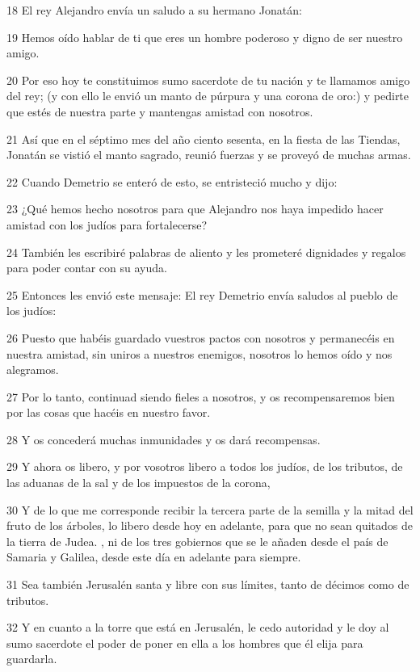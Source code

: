 \par 18 El rey Alejandro envía un saludo a su hermano Jonatán:
\par 19 Hemos oído hablar de ti que eres un hombre poderoso y digno de ser nuestro amigo.
\par 20 Por eso hoy te constituimos sumo sacerdote de tu nación y te llamamos amigo del rey; (y con ello le envió un manto de púrpura y una corona de oro:) y pedirte que estés de nuestra parte y mantengas amistad con nosotros.
\par 21 Así que en el séptimo mes del año ciento sesenta, en la fiesta de las Tiendas, Jonatán se vistió el manto sagrado, reunió fuerzas y se proveyó de muchas armas.
\par 22 Cuando Demetrio se enteró de esto, se entristeció mucho y dijo:
\par 23 ¿Qué hemos hecho nosotros para que Alejandro nos haya impedido hacer amistad con los judíos para fortalecerse?
\par 24 También les escribiré palabras de aliento y les prometeré dignidades y regalos para poder contar con su ayuda.
\par 25 Entonces les envió este mensaje: El rey Demetrio envía saludos al pueblo de los judíos:
\par 26 Puesto que habéis guardado vuestros pactos con nosotros y permanecéis en nuestra amistad, sin uniros a nuestros enemigos, nosotros lo hemos oído y nos alegramos.
\par 27 Por lo tanto, continuad siendo fieles a nosotros, y os recompensaremos bien por las cosas que hacéis en nuestro favor.
\par 28 Y os concederá muchas inmunidades y os dará recompensas.
\par 29 Y ahora os libero, y por vosotros libero a todos los judíos, de los tributos, de las aduanas de la sal y de los impuestos de la corona,
\par 30 Y de lo que me corresponde recibir la tercera parte de la semilla y la mitad del fruto de los árboles, lo libero desde hoy en adelante, para que no sean quitados de la tierra de Judea. , ni de los tres gobiernos que se le añaden desde el país de Samaria y Galilea, desde este día en adelante para siempre.
\par 31 Sea también Jerusalén santa y libre con sus límites, tanto de décimos como de tributos.
\par 32 Y en cuanto a la torre que está en Jerusalén, le cedo autoridad y le doy al sumo sacerdote el poder de poner en ella a los hombres que él elija para guardarla.
